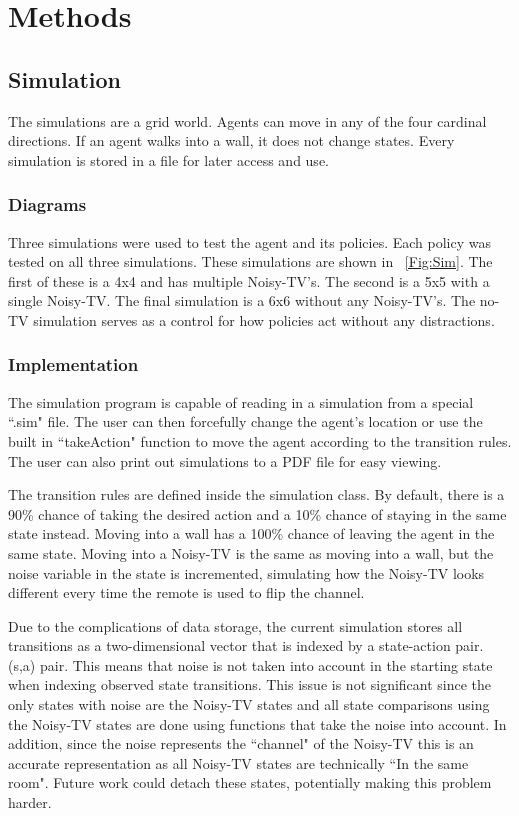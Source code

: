 \documentclass[12pt]{thesis}
\begin{document}

\chapter{Methods}
\section{Simulation}
The simulations are a grid world. Agents can move in any of the four cardinal directions. If an agent walks into a wall, it does not change states. Every simulation is stored in a file for later access and use.
\subsection{Diagrams}
Three simulations were used to test the agent and its policies. Each policy was tested on all three simulations. These simulations are shown in \figurename~\ref{Fig:Sim}. The first of these is a 4x4 and has multiple Noisy-TV's. The second is a 5x5 with a single Noisy-TV. The final simulation is a 6x6 without any Noisy-TV's. The no-TV simulation serves as a control for how policies act without any distractions.
\subsection{Implementation}
The simulation program is capable of reading in a simulation from a special ``.sim" file. The user can then forcefully change the agent's location or use the built in ``takeAction" function to move the agent according to the transition rules. The user can also print out simulations to a PDF file for easy viewing.

The transition rules are defined inside the simulation class. By default, there is a 90\% chance of taking the desired action and a 10\% chance of staying in the same state instead. Moving into a wall has a 100\% chance of leaving the agent in the same state. Moving into a Noisy-TV is the same as moving into a wall, but the noise variable in the state is incremented, simulating how the Noisy-TV looks different every time the remote is used to flip the channel.

Due to the complications of data storage, the current simulation stores all transitions as a two-dimensional vector that is indexed by a state-action pair. (s,a) pair. This means that noise is not taken into account in the starting state when indexing observed state transitions. This issue is not significant since the only states with noise are the Noisy-TV states and all state comparisons using the Noisy-TV states are done using functions that take the noise into account. In addition, since the noise represents the ``channel" of the Noisy-TV this is an accurate representation as all Noisy-TV states are technically ``In the same room". Future work could detach these states, potentially making this problem harder.
\end{document}
